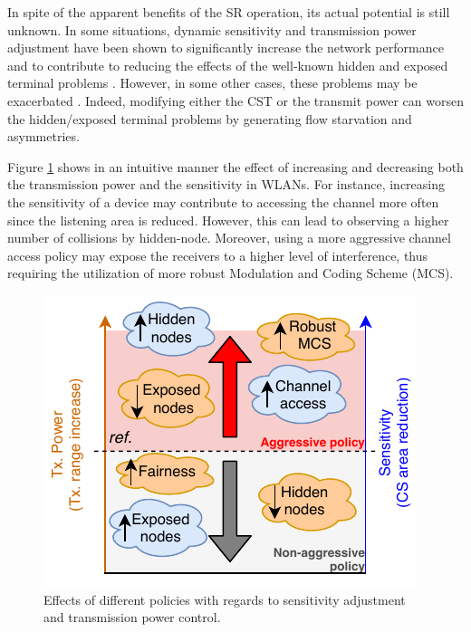 \documentclass{ieeeaccess}
\begin{document}
In spite of the apparent benefits of the SR operation, its actual potential is still unknown. In some situations, dynamic sensitivity and transmission power adjustment have been shown to significantly increase the network performance and to contribute to reducing the effects of the well-known hidden and exposed terminal problems \cite{zhou2005balancing}. However, in some other cases, these problems may be exacerbated \cite{wilhelmi2019potential}. Indeed, modifying either the CST or the transmit power can worsen the hidden/exposed terminal problems by generating flow starvation and asymmetries.

Figure \ref{fig:policies_sr} shows in an intuitive manner the effect of increasing and decreasing both the transmission power and the sensitivity in WLANs. For instance, increasing the sensitivity of a device may contribute to accessing the channel more often since the listening area is reduced. However, this can lead to observing a higher number of collisions by hidden-node. Moreover, using a more aggressive channel access policy may expose the receivers to a higher level of interference, thus requiring the utilization of more robust Modulation and Coding Scheme (MCS).
\begin{figure}[ht!]
	\centering
	\includegraphics[width=0.8\columnwidth]{policies_sr}
	\caption{Effects of different policies with regards to sensitivity adjustment and transmission power control.}
	\label{fig:policies_sr}
\end{figure}
\end{document}

